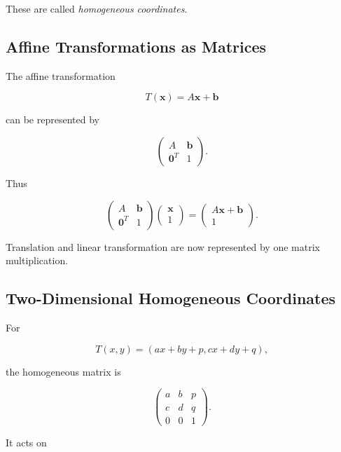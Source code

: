 These are called \emph{homogeneous coordinates}.

\subsection{Affine Transformations as Matrices}
\label{subsec:affine-homogeneous-matrix}

The affine transformation

\[ T(\mathbf{x})=A\mathbf{x}+\mathbf{b} \]

can be represented by

\[
\boxed{
\begin{pmatrix}
A & \mathbf{b}\\
\mathbf{0}^{T} & 1
\end{pmatrix}.
}
\]

Thus

\[
\begin{pmatrix}
A & \mathbf{b}\\
\mathbf{0}^{T} & 1
\end{pmatrix}
\begin{pmatrix}
\mathbf{x}\\
1
\end{pmatrix}
=
\begin{pmatrix}
A\mathbf{x}+\mathbf{b}\\
1
\end{pmatrix}.
\]

Translation and linear transformation are now represented by one matrix
multiplication.

\subsection{Two-Dimensional Homogeneous Coordinates}
\label{subsec:2d-homogeneous-coordinates}

For

\[ T(x,y)=(ax+by+p,cx+dy+q), \]

the homogeneous matrix is

\[
\boxed{
\begin{pmatrix}
a&b&p\\
c&d&q\\
0&0&1
\end{pmatrix}.
}
\]

It acts on

